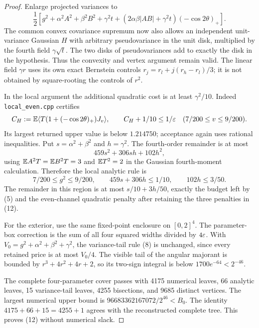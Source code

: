 \begin{proof}
Enlarge projected variances to
\[
 \frac12\left[g^2+\alpha^2A^2+\beta^2B^2+\gamma^2t
 +(2\alpha\beta|AB|+\gamma^2t)(-\cos2\theta)_+\right].       \tag{13}
\]
The common convex covariance supremum now also allows an independent
unit-variance Gaussian $H$ with arbitrary pseudovariance in the unit
disk, multiplied by the fourth field $\gamma\sqrt t$.
The two disks of pseudovariances add to exactly the disk in the
hypothesis. Thus the convexity and vertex argument remain valid.
The linear field $\gamma r$ uses its own exact Bernstein controls
$r_j=r_l+j(r_h-r_l)/3$; it is not obtained by square-rooting the
controls of $r^2$.

In the local argument the additional quadratic cost is at least
$\gamma^2/10$. Indeed \texttt{local\_even.cpp} certifies
\[
 C_H:=\mathbb E\langle T(1+(-\cos2\theta)_+)J_v\rangle,
 \qquad C_H+1/10\le1/\varepsilon
 \quad (7/200\le v\le9/200).
\]
Its largest returned upper value is below $1.214750$; acceptance
again uses rational inequalities. Put $s=\alpha^2+\beta^2$ and
$h=\gamma^2$. The fourth-order remainder is at most
\[
 459s^2+306sh+102h^2,
\]
using $\mathbb E A^2T=\mathbb E B^2T=3$ and $\mathbb E T^2=2$ in the Gaussian
fourth-moment calculation. Therefore the local analytic rule is
\[
 7/200\le g^2\le9/200,\qquad
 459s+306h\le1/10,\qquad102h\le3/50.                      \tag{14}
\]
The remainder in this region is at most $s/10+3h/50$, exactly the
budget left by (5) and the even-channel quadratic penalty after
retaining the three penalties in (12).

For the exterior, use the same fixed-point enclosure on $[0,2]^4$.
The parameter-box correction is the sum of all four squared widths
divided by $4\varepsilon$. With $V_0=g^2+\alpha^2+\beta^2+\gamma^2$, the
variance-tail rule (8) is unchanged, since every retained price is at
most $V_0/4$. The visible tail of the angular majorant is bounded by
$r^3+4r^2+4r+2$, so its two-sign integral is below
$1700e^{-64}<2^{-46}$.

The complete four-parameter cover passes with 4175 numerical leaves,
66 analytic leaves, 15 variance-tail leaves, 4255 bisections, and
9685 distinct vertices. The largest numerical upper bound is
$96683362167072/2^{46}<B_0$. The identity
$4175+66+15=4255+1$ agrees with the reconstructed complete tree.
This proves (12) without numerical slack.
\end{proof}

